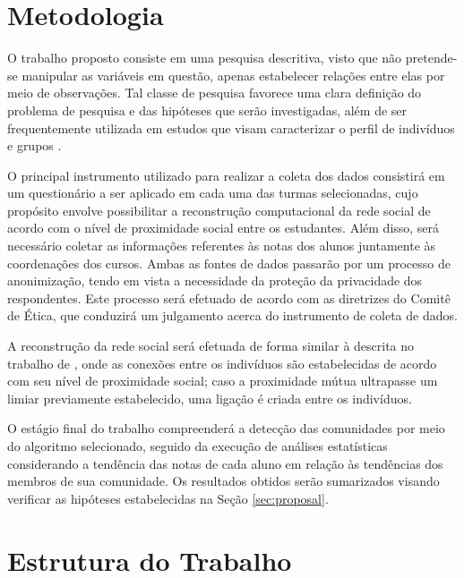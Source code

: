 \section{Metodologia}

O trabalho proposto consiste em uma pesquisa descritiva, visto que não pretende-se manipular as variáveis em questão, apenas estabelecer relações entre elas por meio de observações. Tal classe de pesquisa favorece uma clara definição do problema de pesquisa e das hipóteses que serão investigadas, além de ser frequentemente utilizada em estudos que visam caracterizar o perfil de indivíduos e grupos \cite{Cervo2007}.

O principal instrumento utilizado para realizar a coleta dos dados consistirá em um questionário a ser aplicado em cada uma das turmas selecionadas, cujo propósito envolve possibilitar a reconstrução computacional da rede social de acordo com o nível de proximidade social entre os estudantes. Além disso, será necessário coletar as informações referentes às notas dos alunos juntamente às coordenações dos cursos. Ambas as fontes de dados passarão por um processo de anonimização, tendo em vista a necessidade da proteção da privacidade dos respondentes. Este processo será efetuado de acordo com as diretrizes do Comitê de Ética, que conduzirá um julgamento acerca do instrumento de coleta de dados.

A reconstrução da rede social será efetuada de forma similar à descrita no trabalho de , onde as conexões entre os indivíduos são estabelecidas de acordo com seu nível de proximidade social; caso a proximidade mútua ultrapasse um limiar previamente estabelecido, uma ligação é criada entre os indivíduos.

O estágio final do trabalho compreenderá a detecção das comunidades por meio do algoritmo selecionado, seguido da execução de análises estatísticas considerando a tendência das notas de cada aluno em relação às tendências dos membros de sua comunidade. Os resultados obtidos serão sumarizados visando verificar as hipóteses estabelecidas na Seção \ref{sec:proposal}.

\section{Estrutura do Trabalho}

